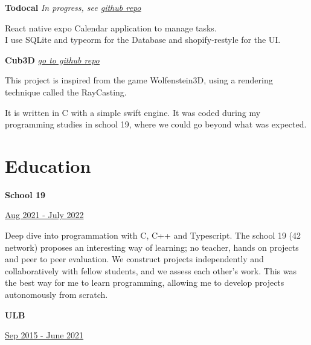 \documentclass[11pt, oneside, a4paper, titlepage]{article}
\begin{document}
\begin{tcolorbox}[colframe=white, colback=white]
\begin{minipage}[t]{0.60\linewidth}
    \textbf{Todocal}
    \emph{In progress, see 
      \href{https://github.com/tamighi/todocal}{\underline{github repo}}
    }
    \medbreak

    \small{
      React native expo Calendar application to manage tasks. \\
      I use SQLite and typeorm for the Database and shopify-restyle for the UI.
    }
    \vspace{0.4cm}

    \textbf{Cub3D}
    \emph{
      \href{https://github.com/Lysique/cub3d}{\underline{go to github repo}}
    }
    \medbreak

    This project is inspired from the game Wolfenstein3D, using a rendering 
    technique called the RayCasting. \medbreak

    It is written in C with a simple swift engine. It was coded during my 
    programming studies in school 19, where we could go beyond what was expected.
    \section*{Education}

    \begin{minipage}{0.45\linewidth}
      \textbf{School 19}
    \end{minipage}
    \begin{minipage}{0.5\linewidth}
      \begin{flushright}
        \underline{Aug 2021 - July 2022}
      \end{flushright}
    \end{minipage}
    \vspace{0.4cm}

    \small{
      Deep dive into programmation with C, C++ and Typescript. The school 19 
      (42 network) proposes an interesting way of learning; no teacher, hands 
      on projects and peer to peer evaluation. We construct projects 
      independently and collaboratively with fellow students, and we assess 
      each other's work.
      This was the best way for me to learn programming, allowing me to develop 
      projects autonomously from scratch.
    }
    \vspace{0.2cm}

    \vspace{0.5cm}

    \begin{minipage}{0.45\linewidth}
      \textbf{ULB}
    \end{minipage}
    \begin{minipage}{0.5\linewidth}
      \begin{flushright}
        \underline{Sep 2015 - June 2021}
      \end{flushright}
    \end{minipage}
    \vspace{0.4cm}


\end{minipage}
\end{tcolorbox}
\end{document}
